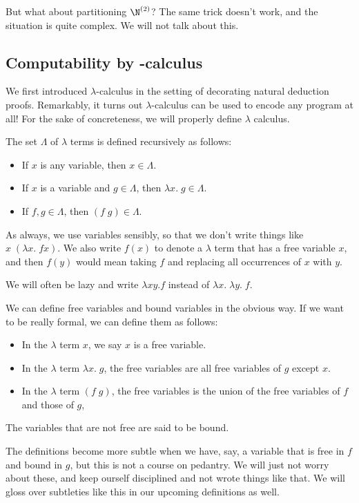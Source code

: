 \documentclass[a4paper]{article}
\begin{document}
But what about partitioning $\N^{(2)}$? The same trick doesn't work, and the situation is quite complex. We will not talk about this.

\subsection{Computability by -calculus} %
We first introduced $\lambda$-calculus in the setting of decorating natural deduction proofs. Remarkably, it turns out $\lambda$-calculus can be used to encode any program at all! For the sake of concreteness, we will properly define $\lambda$ calculus.

\begin{defi}
  The set $\Lambda$ of $\lambda$ terms is defined recursively as follows:
  \begin{itemize}
    \item If $x$ is any variable, then $x \in \Lambda$.
    \item If $x$ is a variable and $g \in \Lambda$, then $\lambda x.\; g \in \Lambda$.
    \item If $f, g \in \Lambda$, then $(f\; g) \in \Lambda$.
  \end{itemize}
\end{defi}
As always, we use variables sensibly, so that we don't write things like $x\;(\lambda x.\; f x)$. We also write $f(x)$ to denote a $\lambda$ term that has a free variable $x$, and then $f(y)$ would mean taking $f$ and replacing all occurrences of $x$ with $y$.

We will often be lazy and write $\lambda xy. f$ instead of $\lambda x.\; \lambda y.\; f$.

We can define free variables and bound variables in the obvious way. If we want to be really formal, we can define them as follows:
\begin{defi}\leavevmode
  \begin{itemize}
    \item In the $\lambda$ term $x$, we say $x$ is a free variable.
    \item In the $\lambda$ term $\lambda x.\; g$, the free variables are all free variables of $g$ except $x$.
    \item In the $\lambda$ term $(f\; g)$, the free variables is the union of the free variables of $f$ and those of $g$,
  \end{itemize}
  The variables that are not free are said to be bound.
\end{defi}
The definitions become more subtle when we have, say, a variable that is free in $f$ and bound in $g$, but this is not a course on pedantry. We will just not worry about these, and keep ourself disciplined and not wrote things like that. We will gloss over subtleties like this in our upcoming definitions as well.
\end{document}
